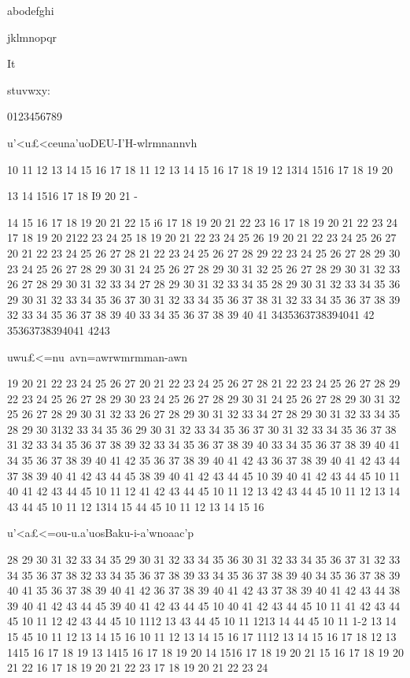 { 

 

 

 

abodefghi

jklmnopqr

It

stuvwxy:

0123456789

 

u'<u£<ceuna'uoDEU-I'H-wlrmnannvh

10 11 12 13 14 15 16 17 18
11 12 13 14 15 16 17 18 19
12 1314 1516 17 18 19 20

13 14 1516 17 18 I9 20 21 -

14 15 16 17 18 19 20 21 22
15 i6 17 18 19 20 21 22 23
16 17 18 19 20 21 22 23 24
17 18 19 20 2122 23 24 25
18 19 20 21 22 23 24 25 26
19 20 21 22 23 24 25 26 27
20 21 22 23 24 25 26 27 28
21 22 23 24 25 26 27 28 29
22 23 24 25 26 27 28 29 30
23 24 25 26 27 28 29 30 31
24 25 26 27 28 29 30 31 32
25 26 27 28 29 30 31 32 33
26 27 28 29 30 31 32 33 34
27 28 29 30 31 32 33 34 35
28 29 30 31 32 33 34 35 36
29 30 31 32 33 34 35 36 37
30 31 32 33 34 35 36 37 38
31 32 33 34 35 36 37 38 39
32 33 34 35 36 37 38 39 40
33 34 35 36 37 38 39 40 41
3435363738394041 42
35363738394041 4243

uwu£<=nu~avn=awrwmrmman-awn

19 20 21 22 23 24 25 26 27
20 21 22 23 24 25 26 27 28
21 22 23 24 25 26 27 28 29
22 23 24 25 26 27 28 29 30
23 24 25 26 27 28 29 30 31
24 25 26 27 28 29 30 31 32
25 26 27 28 29 30 31 32 33
26 27 28 29 30 31 32 33 34
27 28 29 30 31 32 33 34 35
28 29 30 3132 33 34 35 36
29 30 31 32 33 34 35 36 37
30 31 32 33 34 35 36 37 38
31 32 33 34 35 36 37 38 39
32 33 34 35 36 37 38 39 40
33 34 35 36 37 38 39 40 41
34 35 36 37 38 39 40 41 42
35 36 37 38 39 40 41 42 43
36 37 38 39 40 41 42 43 44
37 38 39 40 41 42 43 44 45
38 39 40 41 42 43 44 45 10
39 40 41 42 43 44 45 10 11
40 41 42 43 44 45 10 11 12
41 42 43 44 45 10 11 12 13
42 43 44 45 10 11 12 13 14
43 44 45 10 11 12 1314 15
44 45 10 11 12 13 14 15 16

u'<a£<=ou-u.a'uosBaku-i-a'wnoaac'p

28 29 30 31 32 33 34 35
29 30 31 32 33 34 35 36
30 31 32 33 34 35 36 37
31 32 33 34 35 36 37 38
32 33 34 35 36 37 38 39
33 34 35 36 37 38 39 40
34 35 36 37 38 39 40 41
35 36 37 38 39 40 41 42
36 37 38 39 40 41 42 43
37 38 39 40 41 42 43 44
38 39 40 41 42 43 44 45
39 40 41 42 43 44 45 10
40 41 42 43 44 45 10 11
41 42 43 44 45 10 11 12
42 43 44 45 10 1112 13
43 44 45 10 11 1213 14
44 45 10 11 1-2 13 14 15
45 10 11 12 13 14 15 16
10 11 12 13 14 15 16 17
1112 13 14 15 16 17 18
12 13 1415 16 17 18 19
13 1415 16 17 18 19 20
14 1516 17 18 19 20 21
15 16 17 18 19 20 21 22
16 17 18 19 20 21 22 23
17 18 19 20 21 22 23 24

}
